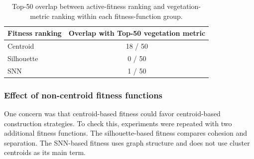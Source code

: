 \documentclass[11pt]{article}
\begin{document}
\begin{table}[ht]
\centering
\caption{Top five configurations by the vegetation metric.}
\label{tab:stage1_top5_ecology}
\end{table}

\begin{table}[ht]
\centering
\caption{Top-50 overlap between active-fitness ranking and vegetation-metric ranking within each fitness-function group.}
\label{tab:stage1_top50_overlap_within_fitness}
\begin{tabular}{lc}
\hline
\textbf{Fitness ranking} & \textbf{Overlap with Top-50 vegetation metric} \\
\hline
Centroid & 18 / 50 \\
Silhouette & 0 / 50 \\
SNN & 1 / 50 \\
\hline
\end{tabular}
\end{table}

\subsubsection{Effect of non-centroid fitness functions}

One concern was that centroid-based fitness could favor centroid-based construction strategies. To check this, experiments were repeated with two additional fitness functions. The silhouette-based fitness compares cohesion and separation. The SNN-based fitness uses graph structure and does not use cluster centroids as its main term.
\end{document}
